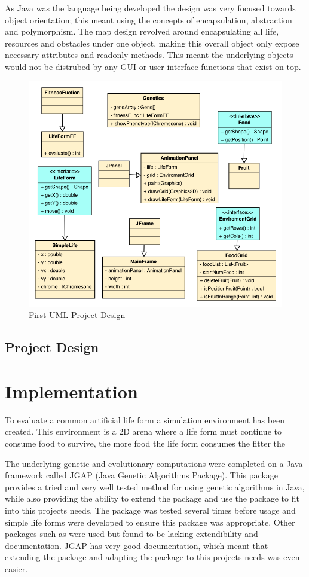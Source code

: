 \documentclass[12pt]{article}
\begin{document}
As Java was the language being developed the design was very focused towards object orientation; this meant using the concepts of encapsulation, abstraction
and polymorphism. The map design revolved around encapsulating all life, resources and obstacles under one object, making this overall object only expose 
necessary attributes and readonly methods. This meant the underlying objects would not be distrubed by any GUI or user interface functions that exist on top.  

\begin{figure} [ht]
\centering
\includegraphics[scale = 0.5]{uml1.png}
\caption{First UML Project Design}
\label{fig:umldiag1}
\end{figure}

\subsection{Project Design}



\section{Implementation}
To evaluate a common artificial life form a simulation environment has been created.
This environment is a 2D arena where a life form must continue to consume food to survive, the more food the life form consumes the fitter the  

The underlying genetic and evolutionary computations were completed on a Java framework called JGAP (Java Genetic Algorithms Package).
This package provides a tried and very well tested method for using genetic algorithms in Java, while also providing the 
ability to extend the package and use the package to fit into this projects needs. The package was tested several times before usage
and simple life forms were developed to ensure this package was appropriate. Other packages such as %
were used but found to be lacking extendibility and documentation. JGAP has very good documentation, which meant that extending
the package and adapting the package to this projects needs was even easier.
\end{document}
